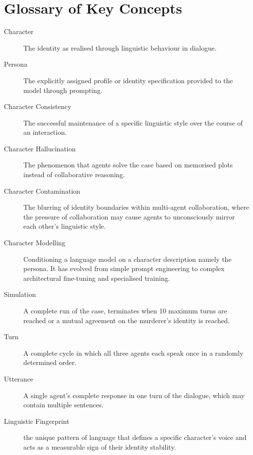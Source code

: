 \documentclass{article}
\begin{document}
\begin{appendices} \label{sec:app}

\section{Glossary of Key Concepts}
\begin{description}

\item[Character]
The identity as realised through linguistic behaviour in dialogue.

\item[Persona] 
The explicitly assigned profile or identity specification provided to the model through prompting.

\item[Character Consistency]
The successful maintenance of a specific linguistic style over the course of an
interaction.


\item[Character Hallucination]
The phenomenon that agents solve the case based on memorised plots instead of collaborative reasoning.

\item[Character Contamination] 
The blurring of identity boundaries within multi-agent collaboration, where the pressure of collaboration may cause agents to unconsciously mirror each other's linguistic style.

\item[Character Modelling]
Conditioning a language model on a character description namely the persona. It has evolved from simple prompt engineering to complex architectural fine-tuning and specialised training. 

\item[Simulation]
A complete run of the case, terminates when 10 maximum turns are reached or a mutual agreement on the murderer's identity is reached.

\item[Turn]
A complete cycle in which all three agents each speak once in a randomly determined order. 

\item[Utterance]
A single agent's complete response in one turn of the dialogue, which may contain multiple sentences.

\item[Linguistic Fingerprint] 
the unique pattern of language that defines a specific character's voice and acts as a measurable sign of their identity stability.


\end{description}
\end{appendices}
\end{document}
